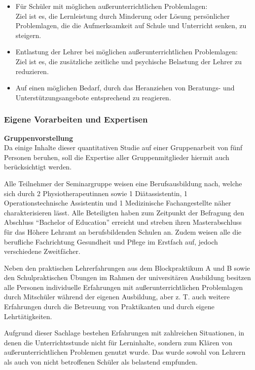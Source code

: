 \begin{itemize}
	\item Für Schüler mit möglichen außerunterrichtlichen Problemlagen:
	\\
	Ziel ist es, die Lernleistung durch Minderung oder Lösung persönlicher Problemlagen, die die Aufmerksamkeit auf Schule und Unterricht senken, zu steigern.
	\item Entlastung der Lehrer bei möglichen außerunterrichtlichen Problemlagen:
	 \\
	Ziel ist es, die zusätzliche zeitliche und psychische Belastung der Lehrer zu reduzieren. 
	\item Auf einen möglichen Bedarf, durch das Heranziehen von Beratungs- und Unterstützungsangebote entsprechend zu reagieren.
\end{itemize}

\subsubsection{Eigene Vorarbeiten und Expertisen}
\label{sec:EigeneVorarbeitenUndExpertisen}

\noindent
\textbf{Gruppenvorstellung}\\

\noindent
Da einige Inhalte dieser quantitativen Studie auf einer Gruppenarbeit von fünf Personen beruhen, soll die Expertise aller Gruppenmitglieder hiermit auch berücksichtigt werden.

Alle Teilnehmer der Seminargruppe weisen eine Berufsausbildung nach, welche sich durch 2 Physiotherapeutinnen sowie 1 Diätassistentin, 1 Operationstechnische Assistentin und 1 Medizinische Fachangestellte näher charakterisieren lässt. Alle Beteiligten haben zum Zeitpunkt der Befragung den Abschluss "`Bachelor of Education"' erreicht und streben ihren Masterabschluss für das Höhere Lehramt an berufsbildenden Schulen an. Zudem weisen alle die berufliche Fachrichtung Gesundheit und Pflege im Erstfach auf, jedoch verschiedene Zweitfächer.

Neben den praktischen Lehrerfahrungen aus dem Blockpraktikum A und B sowie den Schulpraktischen Übungen im Rahmen der universitären Ausbildung besitzen alle Personen individuelle Erfahrungen mit außerunterrichtlichen Problemlagen durch Mitschüler während der eigenen Ausbildung, aber z. T. auch weitere Erfahrungen durch die Betreuung von Praktikanten und durch eigene Lehrtätigkeiten.

Aufgrund dieser Sachlage bestehen Erfahrungen mit zahlreichen Situationen, in denen die Unterrichtsstunde nicht für Lerninhalte, sondern zum Klären von außerunterrichtlichen Problemen genutzt wurde. Das wurde sowohl von Lehrern als auch von nicht betroffenen Schüler als belastend empfunden.

